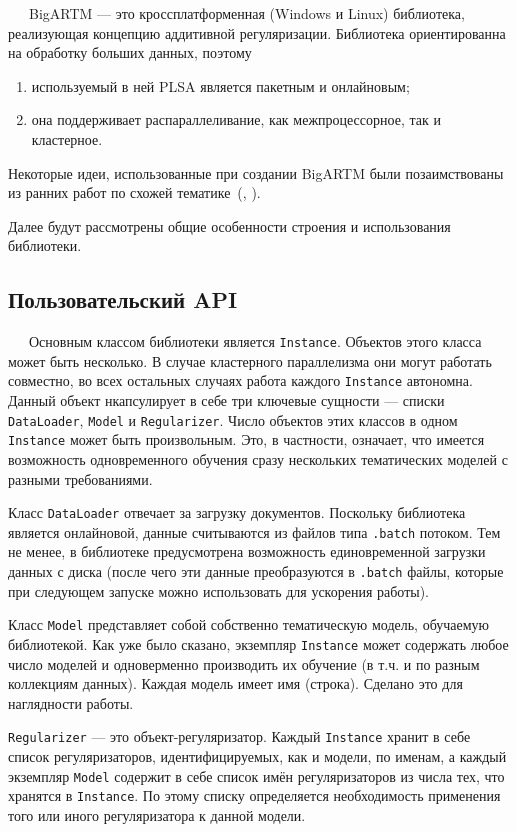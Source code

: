 $\quad\;\:$BigARTM --- это кроссплатформенная (Windows и Linux) библиотека, реализующая концепцию аддитивной регуляризации. Библиотека ориентированна на обработку больших данных, поэтому 

\begin{enumerate}
	\item используемый в ней PLSA является пакетным и онлайновым;
	\item она поддерживает распараллеливание, как межпроцессорное, так и кластерное.
\end{enumerate}

Некоторые идеи, использованные при создании BigARTM были позаимствованы из ранних работ по схожей тематике~(\cite{smola}, \cite{ad_lda}).

Далее будут рассмотрены общие особенности строения и использования библиотеки.

\subsection{Пользовательский API}

$\quad\;\:$Основным классом библиотеки является \verb'Instance'. Объектов этого класса может быть несколько. В случае кластерного параллелизма они могут работать совместно, во всех остальных случаях работа каждого \verb'Instance' автономна. Данный объект нкапсулирует в себе три ключевые сущности --- списки \verb'DataLoader', \verb'Model' и \verb'Regularizer'. Число объектов этих классов в одном \verb'Instance' может быть произвольным. Это, в частности, означает, что имеется возможность одновременного обучения сразу нескольких тематических моделей с разными требованиями. 

Класс \verb'DataLoader' отвечает за загрузку документов. Поскольку библиотека является онлайновой, данные считываются из файлов типа \verb'.batch' потоком. Тем не менее, в библиотеке предусмотрена возможность единовременной загрузки данных с диска (после чего эти данные преобразуются в \verb'.batch' файлы, которые при следующем запуске можно использовать для ускорения работы). 

Класс \verb'Model' представляет собой собственно тематическую модель, обучаемую библиотекой. Как уже было сказано, экземпляр \verb'Instance' может содержать любое число моделей и одноверменно производить их обучение (в т.ч. и по разным коллекциям данных). Каждая модель имеет имя (строка). Сделано это для наглядности работы.

\verb'Regularizer' --- это объект-регуляризатор. Каждый \verb'Instance' хранит в себе список регуляризаторов, идентифицируемых, как и модели, по именам, а каждый экземпляр \verb'Model' содержит в себе список имён регуляризаторов из числа тех, что хранятся в \verb'Instance'.  По этому списку определяется необходимость применения того или иного регуляризатора к данной модели.

